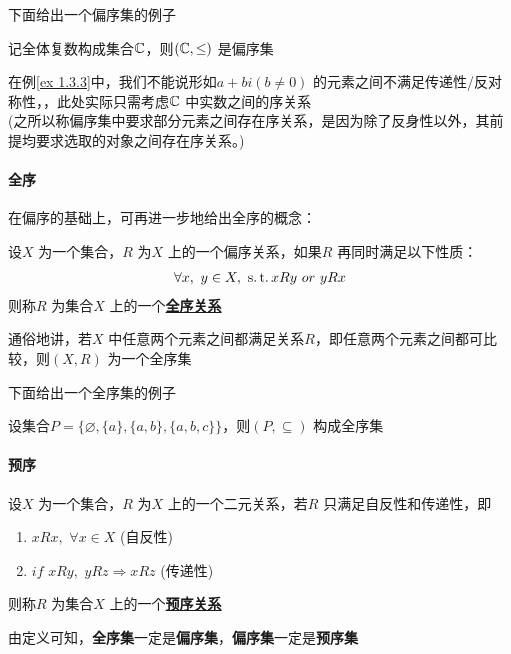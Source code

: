 	下面给出一个偏序集的例子
	\begin{example}\label{ex 1.3.3}
		记全体复数构成集合$\mathbb{C}$，则$(\mathbb{C} , \leq)$ 是偏序集
	\end{example}
	\begin{rmk}
		在例\ref{ex 1.3.3}中，我们不能说形如$a + bi(b \neq 0)$ 的元素之间不满足传递性/反对称性，，此处实际只需考虑$\mathbb{C}$ 中实数之间的序关系\\
		(之所以称偏序集中要求部分元素之间存在序关系，是因为除了反身性以外，其前提均要求选取的对象之间存在序关系。)
	\end{rmk}

\newpage
\paragraph{全序}
	在偏序的基础上，可再进一步地给出全序的概念：
	\begin{defn}\label{def 1.3.3}
		设$X$ 为一个集合，$R$ 为$X$ 上的一个偏序关系，如果$R$ 再同时满足以下性质：
		\begin{align}
			\forall x , \,\, y \in X , \,\, \operatorname{s.t.} xRy \,\, or \,\, yRx
		\end{align}
		则称$R$ 为集合$X$ 上的一个\underline{\textbf{全序关系}}
		\begin{rmk}
			通俗地讲，若$X$ 中任意两个元素之间都满足关系$R$，即任意两个元素之间都可比较，则$(X , R)$ 为一个全序集
		\end{rmk}
	\end{defn}
	
	下面给出一个全序集的例子
	\begin{example}\label{ex 1.3.4}
		设集合$P = \{ \varnothing , \{ a \} , \{a , b \} , \{ a , b , c \} \}$，则$(P , \subseteq)$ 构成全序集
	\end{example}

\paragraph{预序}
	\begin{defn}\label{def 1.3.4}
		设$X$ 为一个集合，$R$ 为$X$ 上的一个二元关系，若$R$ 只满足自反性和传递性，即
		\begin{enumerate}
			\item $xRx , \,\, \forall x \in X \,\,$(自反性)
			
			\item $if \,\, xRy , \,\, yRz \Rightarrow xRz \,\,$(传递性)
		\end{enumerate}
		则称$R$ 为集合$X$ 上的一个\underline{\textbf{预序关系}}
		\begin{rmk}
			由定义可知，\textbf{全序集}一定是\textbf{偏序集}，\textbf{偏序集}一定是\textbf{预序集}
		\end{rmk}
	\end{defn}

